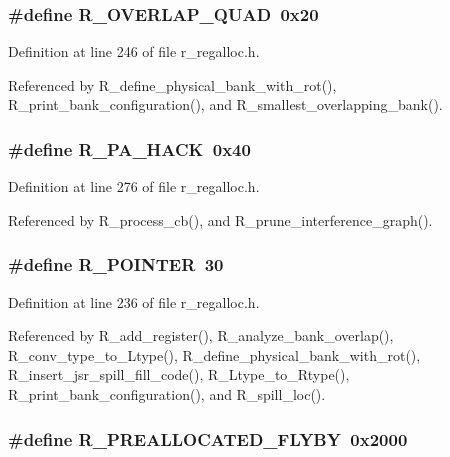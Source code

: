 \subsubsection{\setlength{\rightskip}{0pt plus 5cm}\#define R\_\-OVERLAP\_\-QUAD~0x20}\label{r__regalloc_8h_9f25c7d8017f92e0848cf2526f7e5226}




Definition at line 246 of file r\_\-regalloc.h.

Referenced by R\_\-define\_\-physical\_\-bank\_\-with\_\-rot(), R\_\-print\_\-bank\_\-configuration(), and R\_\-smallest\_\-overlapping\_\-bank().
\subsubsection{\setlength{\rightskip}{0pt plus 5cm}\#define R\_\-PA\_\-HACK~0x40}\label{r__regalloc_8h_3b1103bc13892c3e855cfa4c3a2a9100}




Definition at line 276 of file r\_\-regalloc.h.

Referenced by R\_\-process\_\-cb(), and R\_\-prune\_\-interference\_\-graph().
\subsubsection{\setlength{\rightskip}{0pt plus 5cm}\#define R\_\-POINTER~30}\label{r__regalloc_8h_b80ba431e49ac1f79145afafe3fde93c}




Definition at line 236 of file r\_\-regalloc.h.

Referenced by R\_\-add\_\-register(), R\_\-analyze\_\-bank\_\-overlap(), R\_\-conv\_\-type\_\-to\_\-Ltype(), R\_\-define\_\-physical\_\-bank\_\-with\_\-rot(), R\_\-insert\_\-jsr\_\-spill\_\-fill\_\-code(), R\_\-Ltype\_\-to\_\-Rtype(), R\_\-print\_\-bank\_\-configuration(), and R\_\-spill\_\-loc().
\subsubsection{\setlength{\rightskip}{0pt plus 5cm}\#define R\_\-PREALLOCATED\_\-FLYBY~0x2000}\label{r__regalloc_8h_5a89bf1e821d51a3d5f1addd453fbd1c}




